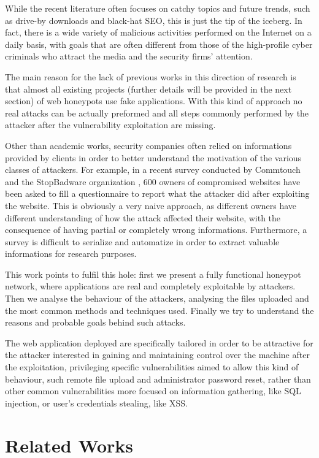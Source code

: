 While the recent literature often focuses on catchy topics and future trends, such as drive-by downloads and black-hat SEO, this is just the tip of the iceberg. In fact, there is a wide variety of malicious activities performed on the Internet on a daily basis, with goals that are often different from those of the high-profile cyber criminals who attract the media and the security firms' attention.

The main reason for the lack of previous works in this direction of research is that almost all existing projects (further details will be provided in the next section) of web honeypots use fake applications. With this kind of approach no real attacks can be actually preformed and all steps commonly performed by the attacker after the vulnerability exploitation are missing.

Other than academic works, security companies often relied on informations provided by clients in order to better understand the motivation of the various classes of attackers. For example, in a recent survey conducted by Commtouch and the StopBadware organization \cite{stopbadawareSurvey}, 600 owners of compromised websites have been asked to fill a questionnaire to report what the attacker did after exploiting the website. This is obviously a very naive approach, as different owners have different understanding of how the attack affected their website, with the consequence of having partial or completely wrong informations. Furthermore, a survey is difficult to serialize and automatize in order to extract valuable informations for research purposes.

This work points to fulfil this hole: first we present a fully functional honeypot network, where applications are real and completely exploitable by attackers. Then we analyse the behaviour of the attackers, analysing the files uploaded and the most common methods and techniques used. Finally we try to understand the reasons and probable goals behind such attacks.

The web application deployed are specifically tailored in order to be attractive for the attacker interested in gaining and maintaining control over the machine after the exploitation, privileging specific vulnerabilities aimed to allow this kind of behaviour, such remote file upload and administrator password reset, rather than other common vulnerabilities more focused on information gathering, like SQL injection, or user's credentials stealing, like XSS.

\section{Related Works}

